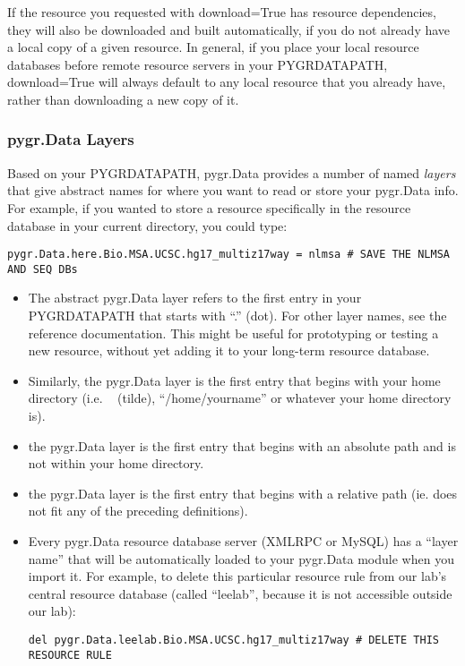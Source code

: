 \documentclass{howto}
\begin{document}
If the resource you requested with download=True has resource
dependencies, they will also be downloaded and built automatically,
if you do not already have a local copy of a given resource.  In general,
if you place your local resource databases before remote resource
servers in your PYGRDATAPATH, download=True will always default to
any local resource that you already have, rather than downloading
a new copy of it.

\subsubsection{pygr.Data Layers}
Based on your PYGRDATAPATH, pygr.Data provides a number of named {\em layers}
that give abstract names for where you want to read or store your pygr.Data info.
For example, if you wanted to store a resource specifically in the resource
database in your current directory, you could type:
\begin{verbatim}
pygr.Data.here.Bio.MSA.UCSC.hg17_multiz17way = nlmsa # SAVE THE NLMSA AND SEQ DBs
\end{verbatim}
\begin{itemize}
\item The abstract pygr.Data layer  refers to the first entry in your
PYGRDATAPATH that starts with ``.'' (dot).  For other layer names, see
the reference documentation.  This might be useful for prototyping or
testing a new resource, without yet adding it to your long-term resource
database.

\item Similarly, the pygr.Data layer
 is the first entry that begins with your home directory
(i.e. ~ (tilde), ``/home/yourname'' or whatever your home directory is).

\item the pygr.Data layer  is the first entry that
begins with an absolute path and is not within your home directory.

\item the pygr.Data layer  is the first entry that
begins with a relative path (ie. does not fit any of the preceding
definitions).

\item Every pygr.Data resource database server (XMLRPC or MySQL) has
a ``layer name'' that will be automatically loaded to your pygr.Data module
when you import it.  For example, to delete this particular resource rule
from our lab's central resource database (called ``leelab'', because it is
not accessible outside our lab):
\begin{verbatim}
del pygr.Data.leelab.Bio.MSA.UCSC.hg17_multiz17way # DELETE THIS RESOURCE RULE
\end{verbatim}
\end{itemize}
\end{document}
